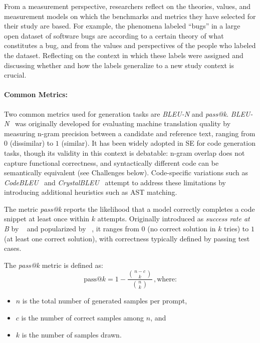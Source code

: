 From a measurement perspective, researchers \should reflect on the theories, values, and measurement models on which the benchmarks and metrics they have selected for their study are based.
For example, the phenomena labeled ``bugs'' in a large open dataset of software bugs are according to a certain theory of what constitutes a bug, and from the values and perspectives of the people who labeled the dataset. Reflecting on the context in which these labels were assigned and discussing whether and how the labels generalize to a new study context is crucial.


\paragraph{Common Metrics:}

Two common metrics used for generation tasks are \emph{BLEU-N} and \emph{pass@k}.
\emph{BLEU-N}~\cite{DBLP:conf/acl/PapineniRWZ02} was originally developed for evaluating machine translation quality by measuring n-gram precision between a candidate and reference text, ranging from $0$ (dissimilar) to $1$ (similar). It has been widely adopted in SE for code generation tasks, though its validity in this context is debatable: n-gram overlap does not capture functional correctness, and syntactically different code can be semantically equivalent (see Challenges below).
Code-specific variations such as \emph{CodeBLEU}~\cite{DBLP:journals/corr/abs-2009-10297} and \emph{CrystalBLEU}~\cite{DBLP:conf/kbse/EghbaliP22} attempt to address these limitations by introducing additional heuristics such as AST matching.

The metric \emph{pass@k} reports the likelihood that a model correctly completes a code snippet at least once within $k$ attempts. Originally introduced as \emph{success rate at B} by \citeauthor{DBLP:journals/corr/abs-1906-04908}~\cite{DBLP:journals/corr/abs-1906-04908} and popularized by \citeauthor{DBLP:journals/corr/abs-2107-03374}~\cite{DBLP:journals/corr/abs-2107-03374}, it ranges from $0$ (no correct solution in $k$ tries) to $1$ (at least one correct solution), with correctness typically defined by passing test cases.

The \emph{pass@k} metric is defined as:
\[
\text{pass@}k = 1 - \frac{\binom{n-c}{k}}{\binom{n}{k}}\,, \text{where:}
\]
\begin{itemize}
  \item $n$ is the total number of generated samples per prompt,
  \item $c$ is the number of correct samples among $n$, and
  \item $k$ is the number of samples drawn.
\end{itemize}


